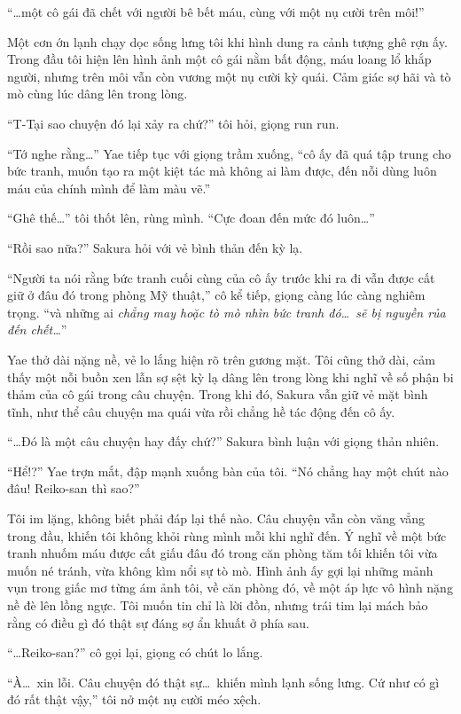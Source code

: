 \documentclass[../main.tex]{subfiles}
\begin{document}
``\dots một cô gái đã chết với người bê bết máu, cùng với một nụ cười trên môi!''

Một cơn ớn lạnh chạy dọc sống lưng tôi khi hình dung ra cảnh tượng ghê rợn ấy. Trong đầu tôi hiện lên hình ảnh một cô gái nằm bất động, máu loang lổ khắp người, nhưng trên môi vẫn còn vương một nụ cười kỳ quái. Cảm giác sợ hãi và tò mò cùng lúc dâng lên trong lòng.

``T-Tại sao chuyện đó lại xảy ra chứ?'' tôi hỏi, giọng run run.

``Tớ nghe rằng\dots'' Yae tiếp tục với giọng trầm xuống, ``cô ấy đã quá tập trung cho bức tranh, muốn tạo ra một kiệt tác mà không ai làm được, đến nỗi dùng luôn máu của chính mình để làm màu vẽ.''

``Ghê thế\dots'' tôi thốt lên, rùng mình. ``Cực đoan đến mức đó luôn\dots''

``Rồi sao nữa?'' Sakura hỏi với vẻ bình thản đến kỳ lạ.

``Người ta nói rằng bức tranh cuối cùng của cô ấy trước khi ra đi vẫn được cất giữ ở đâu đó trong phòng Mỹ thuật,'' cô kể tiếp, giọng càng lúc càng nghiêm trọng. ``và những ai \emph{chẳng may hoặc tò mò nhìn bức tranh đó\dots\ sẽ bị nguyền rủa đến chết\dots}''

Yae thở dài nặng nề, vẻ lo lắng hiện rõ trên gương mặt. Tôi cũng thở dài, cảm thấy một nỗi buồn xen lẫn sợ sệt kỳ lạ dâng lên trong lòng khi nghĩ về số phận bi thảm của cô gái trong câu chuyện. Trong khi đó, Sakura vẫn giữ vẻ mặt bình tĩnh, như thể câu chuyện ma quái vừa rồi chẳng hề tác động đến cô ấy.

``\dots Đó là một câu chuyện hay đấy chứ?'' Sakura bình luận với giọng thản nhiên.

``Hể!?'' Yae trợn mắt, đập mạnh xuống bàn của tôi. ``Nó chẳng hay một chút nào đâu! Reiko-san thì sao?''

Tôi im lặng, không biết phải đáp lại thế nào. Câu chuyện vẫn còn văng vẳng trong đầu, khiến tôi không khỏi rùng mình mỗi khi nghĩ đến. Ý nghĩ về một bức tranh nhuốm máu được cất giấu đâu đó trong căn phòng tăm tối khiến tôi vừa muốn né tránh, vừa không kìm nổi sự tò mò. Hình ảnh ấy gợi lại những mảnh vụn trong giấc mơ từng ám ảnh tôi, về căn phòng đó, về một áp lực vô hình nặng nề đè lên lồng ngực. Tôi muốn tin chỉ là lời đồn, nhưng trái tim lại mách bảo rằng có điều gì đó thật sự đáng sợ ẩn khuất ở phía sau.

``\dots Reiko-san?'' cô gọi lại, giọng có chút lo lắng.

``À\dots\ xin lỗi. Câu chuyện đó thật sự\dots\ khiến mình lạnh sống lưng. Cứ như có gì đó rất thật vậy,'' tôi nở một nụ cười méo xệch.
\end{document}
